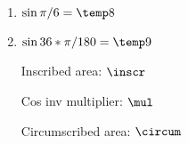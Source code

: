\begin{enumerate}
\item {} 
$\sin \pi/6 = \temp8$

\item {} 
$\sin 36*\pi/180 = \temp9$

Inscribed area: $\inscr$ \par 

Cos inv multiplier: $\mul$

\FPeval{\circum}{\inscr * \mul * \mul} 
Circumscribed area: $\circum$

\end{enumerate}
